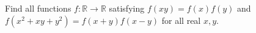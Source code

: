 Find all functions $f:\mathbb R\to\mathbb R$ satisfying $f(xy)=f(x)f(y)$ and $f(x^2+xy+y^2)=f(x+y)f(x-y)$ for all real $x,y$.
